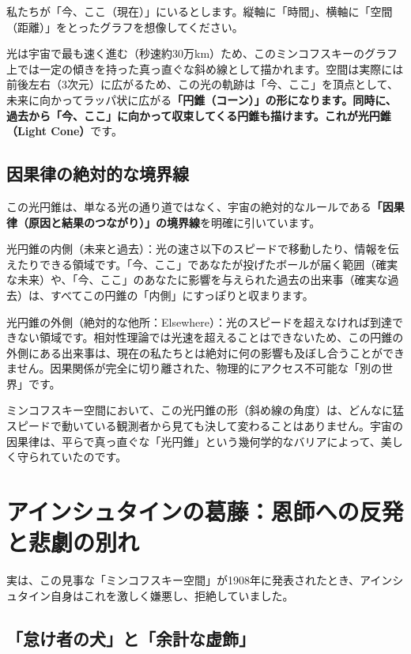 私たちが「今、ここ（現在）」にいるとします。縦軸に「時間」、横軸に「空間（距離）」をとったグラフを想像してください。

光は宇宙で最も速く進む（秒速約30万km）ため、このミンコフスキーのグラフ上では一定の傾きを持った真っ直ぐな斜め線として描かれます。空間は実際には前後左右（3次元）に広がるため、この光の軌跡は「今、ここ」を頂点として、未来に向かってラッパ状に広がる\textbf{「円錐（コーン）」の形になります。同時に、過去から「今、ここ」に向かって収束してくる円錐も描けます。これが光円錐（Light Cone）}です。

\subsection{因果律の絶対的な境界線}

この光円錐は、単なる光の通り道ではなく、宇宙の絶対的なルールである\textbf{「因果律（原因と結果のつながり）」の境界線}を明確に引いています。

光円錐の内側（未来と過去）：光の速さ以下のスピードで移動したり、情報を伝えたりできる領域です。「今、ここ」であなたが投げたボールが届く範囲（確実な未来）や、「今、ここ」のあなたに影響を与えられた過去の出来事（確実な過去）は、すべてこの円錐の「内側」にすっぽりと収まります。

光円錐の外側（絶対的な他所：Elsewhere）：光のスピードを超えなければ到達できない領域です。相対性理論では光速を超えることはできないため、この円錐の外側にある出来事は、現在の私たちとは絶対に何の影響も及ぼし合うことができません。因果関係が完全に切り離された、物理的にアクセス不可能な「別の世界」です。

ミンコフスキー空間において、この光円錐の形（斜め線の角度）は、どんなに猛スピードで動いている観測者から見ても決して変わることはありません。宇宙の因果律は、平らで真っ直ぐな「光円錐」という幾何学的なバリアによって、美しく守られていたのです。

\section{アインシュタインの葛藤：恩師への反発と悲劇の別れ}

実は、この見事な「ミンコフスキー空間」が1908年に発表されたとき、アインシュタイン自身はこれを激しく嫌悪し、拒絶していました。

\subsection{「怠け者の犬」と「余計な虚飾」}

